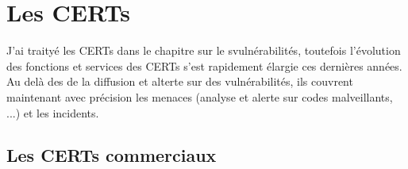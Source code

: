
\section{Les CERTs}

J'ai traityé les CERTs dans le chapitre sur le svulnérabilités, toutefois l'évolution des fonctions et services des CERTs s'est rapidement élargie ces dernières années. Au delà des de la diffusion et alterte sur des vulnérabilités, ils couvrent maintenant avec précision les menaces (analyse et alerte sur codes malveillants, ...) et les incidents. 

\subsection{Les CERTs commerciaux}